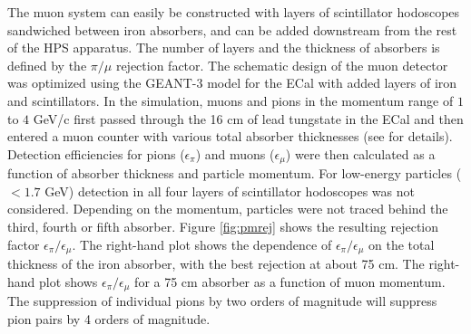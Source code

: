 The muon system can easily be constructed with layers of scintillator hodoscopes sandwiched between iron absorbers, and can be added downstream from the rest of the HPS apparatus.
The number of layers and the thickness of absorbers is defined by the $\pi/\mu$ rejection factor. The schematic design of the muon detector was optimized using the GEANT-3 model for the ECal with added layers of iron and scintillators.  In the simulation, muons and pions in the momentum range of $1$ to $4$ GeV/c first passed through the 16 cm of lead tungstate in the ECal and then entered a muon counter with various total absorber thicknesses (see \cite{HPS_PROP} for details).  Detection efficiencies for pions ($\epsilon_\pi$) and muons ($\epsilon_\mu$) were then calculated as a function of absorber thickness and particle momentum.  For low-energy particles ($< 1.7$ GeV) detection in all four layers of scintillator hodoscopes was not considered. Depending on the momentum, particles were not traced behind the third, fourth or fifth absorber.  
Figure \ref{fig:pmrej} shows the resulting rejection factor $\epsilon_\pi/\epsilon_\mu$.  The right-hand plot shows the dependence of  $\epsilon_\pi/\epsilon_\mu$ on the total thickness of the iron absorber, with the best rejection at about 75 cm.  The right-hand plot shows $\epsilon_\pi/\epsilon_\mu$ for a 75 cm absorber as a function of muon momentum.  The suppression of individual pions by two orders of magnitude will suppress pion pairs by 4 orders of magnitude.  

